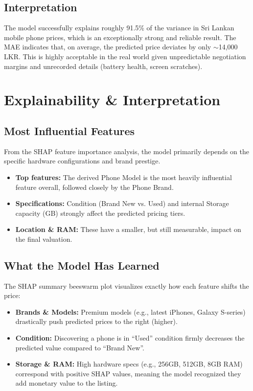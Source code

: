 \documentclass[12pt,a4paper]{article}
\begin{document}
\subsection{Interpretation}
The model successfully explains roughly 91.5\% of the variance in Sri Lankan mobile phone prices, which is an exceptionally strong and reliable result. The MAE indicates that, on average, the predicted price deviates by only $\sim$14,000 LKR. This is highly acceptable in the real world given unpredictable negotiation margins and unrecorded details (battery health, screen scratches). 

\section{Explainability \& Interpretation}

\subsection{Most Influential Features}
From the SHAP feature importance analysis, the model primarily depends on the specific hardware configurations and brand prestige. 


\begin{itemize}
    \item \textbf{Top features:} The derived Phone Model is the most heavily influential feature overall, followed closely by the Phone Brand. 
    \item \textbf{Specifications:} Condition (Brand New vs. Used) and internal Storage capacity (GB) strongly affect the predicted pricing tiers. 
    \item \textbf{Location \& RAM:} These have a smaller, but still measurable, impact on the final valuation.
\end{itemize}

\subsection{What the Model Has Learned}
The SHAP summary beeswarm plot visualizes exactly how each feature shifts the price: 


\begin{itemize}
    \item \textbf{Brands \& Models:} Premium models (e.g., latest iPhones, Galaxy S-series) drastically push predicted prices to the right (higher). 
    \item \textbf{Condition:} Discovering a phone is in ``Used'' condition firmly decreases the predicted value compared to ``Brand New''. 
    \item \textbf{Storage \& RAM:} High hardware specs (e.g., 256GB, 512GB, 8GB RAM) correspond with positive SHAP values, meaning the model recognized they add monetary value to the listing. 
\end{itemize}
\end{document}
